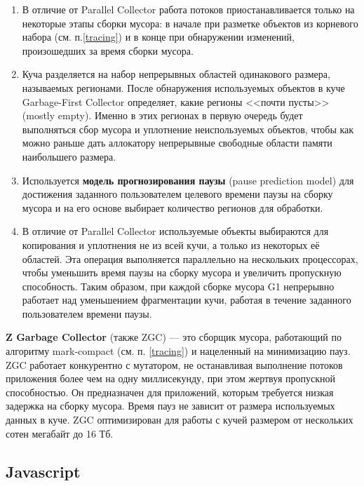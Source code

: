 \begin{enumerate}[label*=\arabic*.]
	\item В отличие от Parallel Collector работа потоков приостанавливается только на некоторые этапы сборки мусора: в начале при разметке объектов из корневого набора (см. п.\ref{tracing}) и в конце при обнаружении изменений, произошедших за время сборки мусора.~\cite{java_jrockit_memory} %
	\item Куча разделяется на набор непрерывных областей одинакового размера, называемых регионами. После обнаружения используемых объектов в куче Garbage-First Collector определяет, какие регионы <<почти пусты>> (mostly empty). Именно в этих регионах в первую очередь будет выполняться сбор мусора и уплотнение неиспользуемых объектов, чтобы как можно раньше дать аллокатору непрерывные свободные области памяти наибольшего размера.
	\item Используется \textbf{модель прогнозирования паузы} (pause prediction model) для достижения заданного пользователем целевого времени паузы на сборку мусора и на его основе выбирает количество регионов для обработки.
	\item В отличие от Parallel Collector используемые объекты выбираются для копирования и уплотнения не из всей кучи, а только из некоторых её областей. Эта операция выполняется параллельно на нескольких процессорах, чтобы уменьшить время паузы на сборку мусора и увеличить пропускную способность. Таким образом, при каждой сборке мусора G1 непрерывно работает над уменьшением фрагментации кучи, работая в течение заданного пользователем времени паузы.
\end{enumerate}

\textbf{Z Garbage Collector} (также ZGC) --- это сборщик мусора, работающий по алгоритму mark-compact (см. п. \ref{tracing}) и нацеленный на минимизацию пауз. ZGC работает конкурентно с мутатором, не останавливая выполнение потоков приложения более чем на одну миллисекунду, при этом жертвуя пропускной способностью. Он предназначен для приложений, которым требуется низкая задержка на сборку мусора. Время пауз не зависит от размера используемых данных в куче. ZGC оптимизирован для работы с кучей размером от нескольких сотен мегабайт до 16 Тб.~\cite{java_zgc}

\subsection{Javascript}

